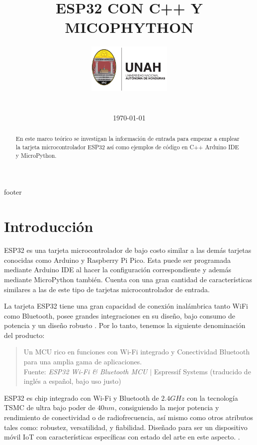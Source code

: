 \documentclass[conference]{IEEEtran}
\title{ESP32 CON C++ Y MICOPHYTHON}
\author{
    \includegraphics[width = 40mm]{images/logo-unah}\\[8ex]
    \IEEEauthorblockN{Tobias Briones}
    \IEEEauthorblockN{tobias.briones@unah.hn}
    \IEEEauthorblockA{\textit{Universidad Nacional Autónoma de Honduras} \\
    \textit{Ingeniería de Sistemas} \\
    \textit{I PAC 2022} \\
    \textit{IS911-MICROPROCESADORES}} \\\vspace*{20pt} \normalsize  \\
    \today
}
\begin{document}
    \maketitle

    \begin{abstract}
        En este marco teórico se investigan la información de entrada para
        empezar a emplear la tarjeta microcontrolador ESP32 así como ejemplos
        de código en C++ Arduino IDE y MicroPython.
    \end{abstract}

    \tableofcontents

    {footer}

    \section{Introducción}\label{sec:introduction}

    ESP32 es una tarjeta microcontrolador de bajo costo
    \cite{wikipedia-esp32-2022} similar a las demás tarjetas conocidas como
    Arduino y Raspberry Pi Pico. Esta puede ser programada mediante Arduino
    IDE al hacer la configuración correspondiente y además mediante
    MicroPython también. Cuenta con una gran cantidad de características
    similares a las de este tipo de tarjetas microcontrolador de entrada.

    \bigbreak

    La tarjeta ESP32 tiene una gran capacidad de conexión inalámbrica tanto
    WiFi como Bluetooth, posee grandes integraciones en su diseño, bajo
    consumo de potencia y un diseño robusto
    \cite{espressif-systems-shanghai-co-ltd-2022A}. Por lo tanto, tenemos la
    siguiente denominación del producto:

    \bigbreak

    \begin{quote}
        Un MCU rico en funciones con Wi-Fi integrado y Conectividad Bluetooth
        para una amplia gama de aplicaciones.\\ \footnotesize
        Fuente: \textit{ESP32 Wi-Fi \& Bluetooth MCU} $\mid$ Espressif
        Systems \cite{espressif-systems-shanghai-co-ltd-2022A} (traducido de
        inglés a español, bajo uso justo)
    \end{quote}

    \bigbreak

    ESP32 es chip integrado con Wi-Fi y Bluetooth de $2.4GHz$ con la
    tecnología TSMC de ultra bajo poder de $40nm$, consiguiendo la mejor
    potencia y rendimiento de conectividad o de radiofrecuencia, así mismo
    como otros atributos tales como: robustez, versatilidad, y fiabilidad.
    Diseñado para ser un dispositivo móvil IoT con características
    específicas con estado del arte en este aspecto.
    \cite{espressif-systems-shanghai-co-ltd-2022B}.
\end{document}
